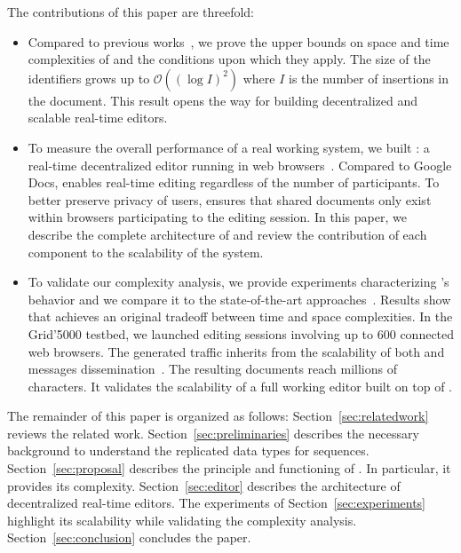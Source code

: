 \noindent The contributions of this paper are threefold:
\begin{itemize}
\item Compared to previous works~\cite{nedelec2013concurrency, nedelec2013lseq},
  we prove the upper bounds on space and time complexities of \LSEQ and the
  conditions upon which they apply. The size of the identifiers grows up to
  $\mathcal{O}((\log I)^2)$ where $I$ is the number of insertions in the
  document. This result opens the way for building decentralized and scalable
  real-time editors.
\item To measure the overall performance of a real working system, we built
  \CRATE: a real-time decentralized editor running in web
  browsers~\cite{nedelec2016crate}. Compared to Google Docs, \CRATE enables
  real-time editing regardless of the number of participants. To better preserve
  privacy of users, \CRATE ensures that shared documents only exist within
  browsers participating to the editing session. In this paper, we describe the
  complete architecture of \CRATE and review the contribution of each component
  to the scalability of the system.
\item To validate our complexity analysis, we provide experiments characterizing
  \LSEQ's behavior and we compare it to the state-of-the-art
  approaches~\cite{preguica2009commutative, weiss2009logoot}. Results show that
  \LSEQ achieves an original tradeoff between time and space complexities. In
  the Grid'5000 testbed, we launched \CRATE editing sessions involving up to 600
  connected web browsers. The generated traffic inherits from the scalability of
  both \LSEQ and messages dissemination~\cite{nedelec2015spray}. The resulting
  documents reach millions of characters. It validates the scalability of a full
  working editor built on top of \LSEQ.
\end{itemize}

The remainder of this paper is organized as follows:
Section~\ref{sec:relatedwork} reviews the related work.
Section~\ref{sec:preliminaries} describes the necessary background to understand
the replicated data types for sequences. Section~\ref{sec:proposal} describes
the principle and functioning of \LSEQ. In particular, it provides its
complexity. Section~\ref{sec:editor} describes the architecture of decentralized
real-time editors. The experiments of Section~\ref{sec:experiments} highlight
its scalability while validating the complexity analysis.
Section~\ref{sec:conclusion} concludes the paper.

